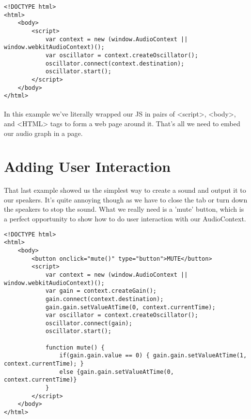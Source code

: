 \begin{lstlisting}
<!DOCTYPE html>
<html>
    <body>
        <script>
            var context = new (window.AudioContext || window.webkitAudioContext)();
            var oscillator = context.createOscillator();
            oscillator.connect(context.destination);
            oscillator.start();
        </script>
    </body>
</html>
\end{lstlisting}

\paragraph{} In this example we've literally wrapped our JS in pairs of <script>, <body>, and <HTML> tags to form a web page around it. That's all we need to embed our audio graph in a page.

\section{Adding User Interaction}
\paragraph{} That last example showed us the simplest way to create a sound and output it to our speakers. It's quite annoying though as we have to close the tab or turn down the speakers to stop the sound. What we really need is a 'mute' button, which is a perfect opportunity to show how to do user interaction with our AudioContext.

\begin{lstlisting}
<!DOCTYPE html>
<html>
    <body>
        <button onclick="mute()" type="button">MUTE</button>
        <script>
            var context = new (window.AudioContext || window.webkitAudioContext)();
            var gain = context.createGain();
            gain.connect(context.destination);
            gain.gain.setValueAtTime(0, context.currentTime);
            var oscillator = context.createOscillator();
            oscillator.connect(gain);
            oscillator.start();

            function mute() {
                if(gain.gain.value == 0) { gain.gain.setValueAtTime(1, context.currentTime); }
                else {gain.gain.setValueAtTime(0, context.currentTime)}
            }
        </script>
    </body>
</html>
\end{lstlisting}


